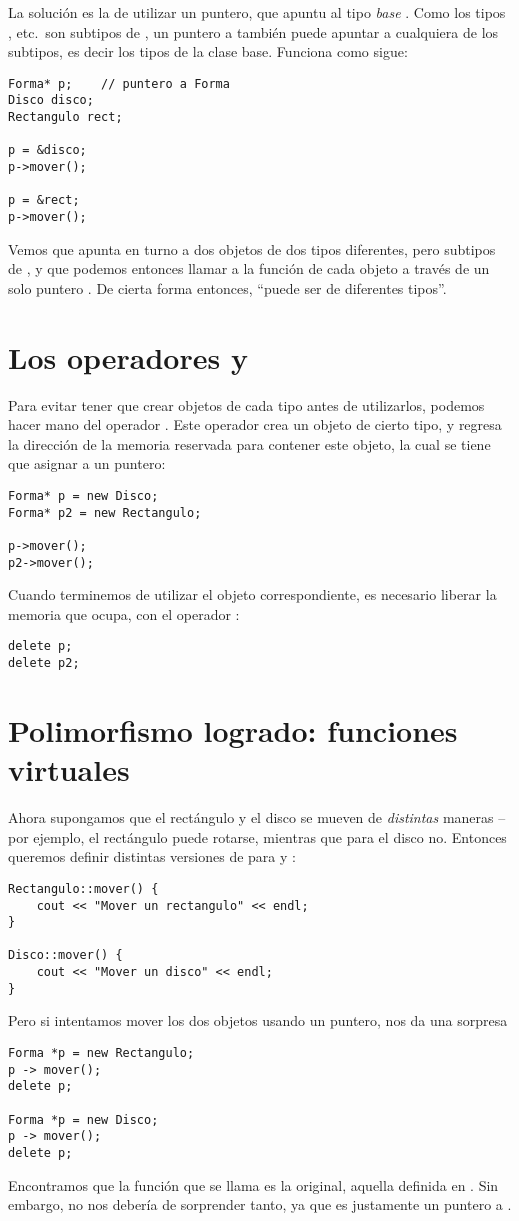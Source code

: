 La solución es la de utilizar un puntero, que apuntu al tipo \emph{base} . Como los tipos ,  etc.\ son subtipos de , un puntero a  también puede apuntar a cualquiera de los subtipos, es decir los tipos  de la clase base.
Funciona como sigue:
\begin{lstlisting}
Forma* p;    // puntero a Forma
Disco disco;
Rectangulo rect;

p = &disco;
p->mover();

p = &rect;
p->mover();
\end{lstlisting}
Vemos que  apunta en turno a dos objetos de dos tipos diferentes, pero subtipos de , y que podemos entonces llamar a la función 
 de cada objeto a través de un solo puntero . De cierta forma entonces,  ``puede ser de diferentes tipos''.

\section{Los operadores  y }
Para evitar tener que crear objetos de cada tipo antes de utilizarlos, podemos hacer mano del operador . Este operador crea un objeto de cierto tipo, y regresa la dirección de la memoria reservada para contener este objeto, la cual se tiene que asignar a un puntero:
\begin{lstlisting}
Forma* p = new Disco;
Forma* p2 = new Rectangulo;

p->mover();
p2->mover();
\end{lstlisting}
Cuando terminemos de utilizar el objeto correspondiente, es necesario liberar la memoria que ocupa, con el operador :
\begin{lstlisting}
delete p;
delete p2;
\end{lstlisting}

\section{Polimorfismo logrado: funciones virtuales}
Ahora supongamos que el rectángulo y el disco se mueven de \emph{distintas} maneras --por ejemplo, el rectángulo puede rotarse, mientras que para el disco no.
Entonces queremos definir distintas versiones de  para  y :
\begin{lstlisting}
Rectangulo::mover() {
	cout << "Mover un rectangulo" << endl;
}

Disco::mover() {
	cout << "Mover un disco" << endl;
}
\end{lstlisting}
Pero si intentamos mover los dos objetos usando un puntero, nos da una sorpresa
\begin{lstlisting}
Forma *p = new Rectangulo;
p -> mover();
delete p;

Forma *p = new Disco;
p -> mover();
delete p;
\end{lstlisting}
Encontramos que la función que se llama es la  original, aquella definida en .
Sin embargo, no nos debería de sorprender tanto, ya que  es justamente un puntero a .

